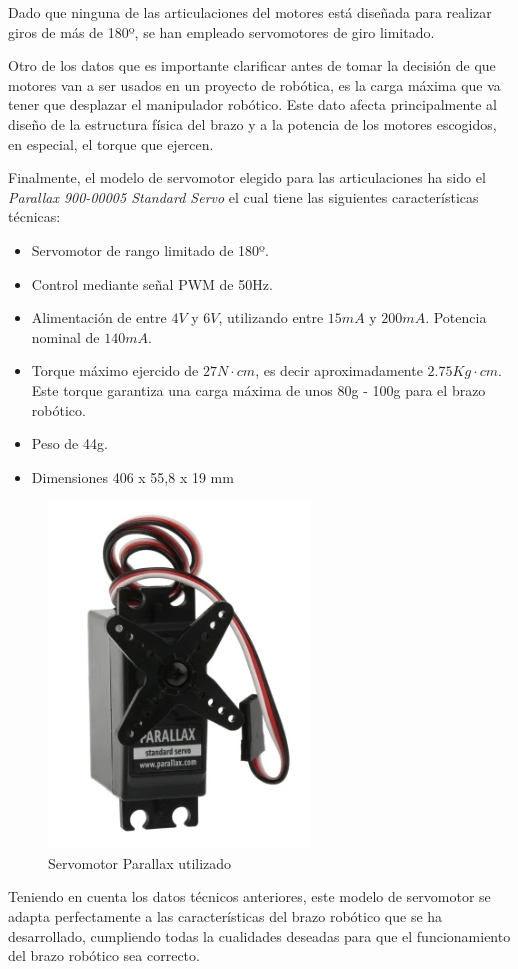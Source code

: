 Dado que ninguna de las articulaciones del motores está diseñada para realizar giros de más de 180º, se han empleado servomotores de giro limitado.

Otro de los datos que es importante clarificar antes de tomar la decisión de que motores van a ser usados en un proyecto de robótica, es la carga máxima que va tener que desplazar el manipulador robótico. Este dato afecta principalmente al diseño de la estructura física del brazo y a la potencia de los motores escogidos, en especial, el torque que ejercen. 

Finalmente, el modelo de servomotor elegido para las articulaciones ha sido el \textit{Parallax 900-00005 Standard Servo} el cual tiene las siguientes características técnicas:

\begin{itemize}
    \item Servomotor de rango limitado de 180º.
    \item Control mediante señal \ac{PWM} de 50Hz.
    \item Alimentación de entre $4V$ y $6V$, utilizando entre $15mA$ y $200mA$. Potencia nominal de $140mA$.
    \item Torque máximo ejercido de $27N\cdot cm$, es decir aproximadamente $2.75 Kg\cdot cm$. Este torque garantiza una carga máxima de unos 80g - 100g para el brazo robótico.
    \item Peso de 44g.
    \item Dimensiones 406 x 55,8 x 19 mm
\end{itemize}

\begin{figure}[H]
    \centering 
    \includegraphics[width=.35\linewidth]{pictures/ServoParallax.PNG}
    \caption{Servomotor Parallax utilizado \cite{90000005ServomotorParallax}}
    \label{fig:}
\end{figure}

Teniendo en cuenta los datos técnicos anteriores, este modelo de servomotor se adapta perfectamente a las características del brazo robótico que se ha desarrollado, cumpliendo todas la cualidades deseadas para que el funcionamiento del brazo robótico sea correcto.
